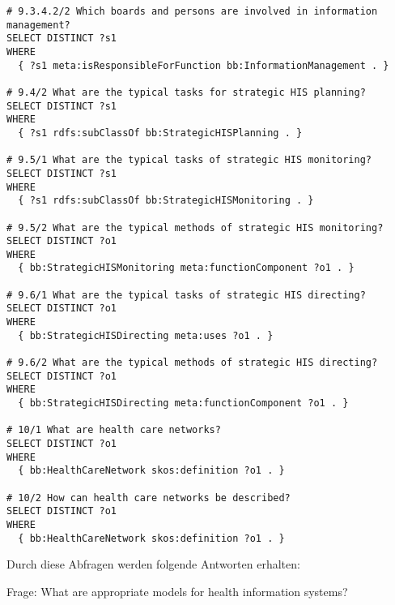 \begin{lstlisting}[language=SPARQL]
# 9.3.4.2/2 Which boards and persons are involved in information management?
SELECT DISTINCT ?s1
WHERE
  { ?s1 meta:isResponsibleForFunction bb:InformationManagement . }

# 9.4/2 What are the typical tasks for strategic HIS planning?
SELECT DISTINCT ?s1
WHERE
  { ?s1 rdfs:subClassOf bb:StrategicHISPlanning . }

# 9.5/1 What are the typical tasks of strategic HIS monitoring?
SELECT DISTINCT ?s1
WHERE
  { ?s1 rdfs:subClassOf bb:StrategicHISMonitoring . }

# 9.5/2 What are the typical methods of strategic HIS monitoring?
SELECT DISTINCT ?o1
WHERE
  { bb:StrategicHISMonitoring meta:functionComponent ?o1 . }

# 9.6/1 What are the typical tasks of strategic HIS directing?
SELECT DISTINCT ?o1
WHERE
  { bb:StrategicHISDirecting meta:uses ?o1 . }

# 9.6/2 What are the typical methods of strategic HIS directing?
SELECT DISTINCT ?o1
WHERE
  { bb:StrategicHISDirecting meta:functionComponent ?o1 . }

# 10/1 What are health care networks?
SELECT DISTINCT ?o1
WHERE
  { bb:HealthCareNetwork skos:definition ?o1 . }

# 10/2 How can health care networks be described?
SELECT DISTINCT ?o1
WHERE
  { bb:HealthCareNetwork skos:definition ?o1 . }

\end{lstlisting}

Durch diese Abfragen werden folgende Antworten erhalten:

Frage: What are appropriate models for health information systems?

